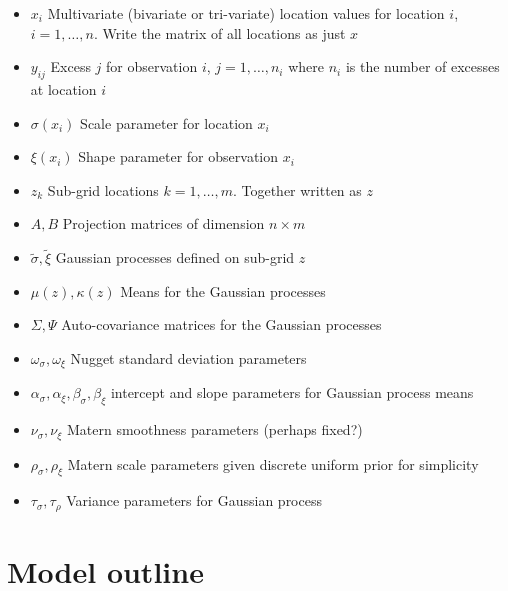 \documentclass{article}
\begin{document}
\begin{itemize}
\item $x_i$ Multivariate (bivariate or tri-variate) location values for location $i$, $i = 1,\ldots, n$. Write the matrix of all locations as just $x$
\item $y_{ij}$ Excess $j$ for observation $i$, $j = 1,\ldots,n_i$ where $n_i$ is the number of excesses at location $i$
\item $\sigma(x_i)$ Scale parameter for location $x_i$
\item $\xi(x_i)$ Shape parameter for observation $x_i$
\item $z_k$ Sub-grid locations $k = 1, \ldots, m$. Together written as $z$
\item $A, B$ Projection matrices of dimension $n \times m$
\item $\tilde{\sigma}, \tilde{\xi}$ Gaussian processes defined on sub-grid $z$
\item $\mu(z), \kappa(z)$ Means for the Gaussian processes
\item $\Sigma, \Psi$ Auto-covariance matrices for the Gaussian processes
\item $\omega_\sigma, \omega_\xi$ Nugget standard deviation parameters
\item $\alpha_\sigma, \alpha_\xi, \beta_\sigma, \beta_\xi$ intercept and slope parameters for Gaussian process means
\item $\nu_\sigma, \nu_\xi$ Matern smoothness parameters (perhaps fixed?)
\item $\rho_\sigma, \rho_\xi$ Matern scale parameters given discrete uniform prior for simplicity
\item $\tau_\sigma, \tau_\rho$ Variance parameters for Gaussian process
\end{itemize}

\section{Model outline}
\end{document}
